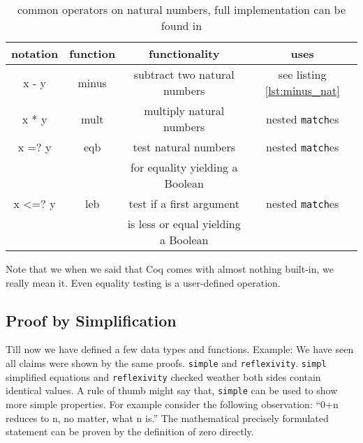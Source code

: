	   \begin{table}   
	   \begin{tabular}{|c|c|c|c|}
	     \hline 
	 	  notation      & function        & functionality                       & uses           \\  \hline
	 	  x - y         & minus           & subtract two natural numbers        & see listing  \ref{lst:minus_nat} \\  \hline
	      x * y         & mult            & multiply natural numbers            & nested \lstinline!match!es \\  \hline   
	   	  x =? y        & eqb             & test natural numbers                & nested \lstinline!match!es \\  
	  	                &                 & for equality yielding a Boolean     &                \\  \hline
	   	  x <=? y       & leb             & test if a first argument            & nested \lstinline!match!es \\  
	   	                &                 & is less or equal yielding a Boolean &                \\  \hline
	   \end{tabular}
	   \caption{common operators on natural numbers, full implementation can be found in \cite[section: Basics, Functional Programming in Coq: Numbers]{PACGGHSY}}
	   \label{tab:operators}	   
	   \end{table}   
	   
		Note that we when we said that Coq comes with almost nothing built-in, we really mean it.
	    Even equality testing is a user-defined operation.
	    
	   \subsection{Proof by Simplification}
	   \label{subsec:ProofBySimplifictaion}
	   
	   Till now we have defined a few data types and functions.
	   Example: We have seen all claims were shown by the same proofs. \lstinline!simple! and \lstinline!reflexivity!. 
	   \lstinline!simpl! simplified equations and \lstinline!reflexivity! checked weather both sides contain identical values.
	   A rule of thumb might say that, \lstinline!simple! can be used to show more simple properties.
	   For example consider the following observation: ``0+n reduces to n, no matter, what n is.''
	   The mathematical precisely formulated statement can be proven by the definition of zero directly.
	   
